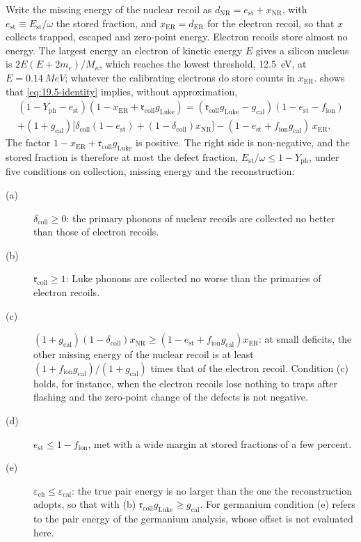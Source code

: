 Write the missing energy of the nuclear recoil as $d_{\mathrm{NR}} = e_{\mathrm{st}} + x_{\mathrm{NR}}$, with $e_{\mathrm{st}} \equiv E_{\mathrm{st}}/\omega$ the stored fraction, and $x_{\mathrm{ER}} = d_{\mathrm{ER}}$ for the electron recoil, so that $x$ collects trapped, escaped and zero-point energy. Electron recoils store almost no energy. The largest energy an electron of kinetic energy $E$ gives a silicon nucleus is $2E(E + 2m_e)/M_\kappa$, which reaches the lowest threshold, \SI{12.5}{eV}, at $E = \SI{0.14}{MeV}$; whatever the calibrating electrons do store counts in $x_{\mathrm{ER}}$.  shows that \cref{eq:19.5-identity} implies, without approximation,
\begin{multline}
  (1 - Y_{\mathrm{ph}} - e_{\mathrm{st}})(1 - x_{\mathrm{ER}} + \mathfrak{r}_{\mathrm{coll}}g_{\mathrm{Luke}}) = (\mathfrak{r}_{\mathrm{coll}}g_{\mathrm{Luke}} - g_{\mathrm{cal}})(1 - e_{\mathrm{st}} - f_{\mathrm{ion}}) \\
  + (1 + g_{\mathrm{cal}})\bigl[\delta_{\mathrm{coll}}(1 - e_{\mathrm{st}}) + (1 - \delta_{\mathrm{coll}})x_{\mathrm{NR}}\bigr] - (1 - e_{\mathrm{st}} + f_{\mathrm{ion}}g_{\mathrm{cal}})\,x_{\mathrm{ER}} .
  \label{eq:19.5-bound}
\end{multline}
The factor $1 - x_{\mathrm{ER}} + \mathfrak{r}_{\mathrm{coll}}g_{\mathrm{Luke}}$ is positive. The right side is non-negative, and the stored fraction is therefore at most the defect fraction, $E_{\mathrm{st}}/\omega \le 1 - Y_{\mathrm{ph}}$, under five conditions on collection, missing energy and the reconstruction:
\begin{description}
\item[(a)] $\delta_{\mathrm{coll}} \ge 0$: the primary phonons of nuclear recoils are collected no better than those of electron recoils.
\item[(b)] $\mathfrak{r}_{\mathrm{coll}} \ge 1$: Luke phonons are collected no worse than the primaries of electron recoils.
\item[(c)] $(1 + g_{\mathrm{cal}})(1 - \delta_{\mathrm{coll}})x_{\mathrm{NR}} \ge (1 - e_{\mathrm{st}} + f_{\mathrm{ion}}g_{\mathrm{cal}})x_{\mathrm{ER}}$: at small deficits, the other missing energy of the nuclear recoil is at least $(1 + f_{\mathrm{ion}}g_{\mathrm{cal}})/(1 + g_{\mathrm{cal}})$ times that of the electron recoil. Condition (c) holds, for instance, when the electron recoils lose nothing to traps after flashing and the zero-point change of the defects is not negative.
\item[(d)] $e_{\mathrm{st}} \le 1 - f_{\mathrm{ion}}$, met with a wide margin at stored fractions of a few percent.
\item[(e)] $\varepsilon_{\mathrm{eh}} \le \varepsilon_{\mathrm{cal}}$: the true pair energy is no larger than the one the reconstruction adopts, so that with (b) $\mathfrak{r}_{\mathrm{coll}}g_{\mathrm{Luke}} \ge g_{\mathrm{cal}}$. For germanium condition (e) refers to the pair energy of the germanium analysis, whose offset is not evaluated here.
\end{description}
